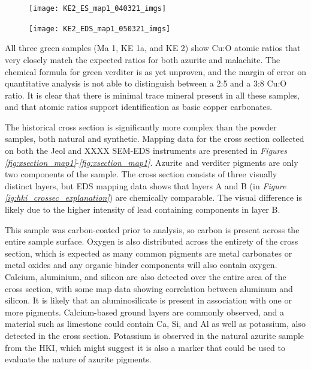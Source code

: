 \begin{figure}[H]
\centering
  \texttt{[image: KE2\_ES\_map1\_040321\_imgs]}
\label{fig:ke2_map1}
\end{figure}

\begin{figure}[H]
\centering
  \texttt{[image: KE2\_EDS\_map1\_050321\_imgs]}
\label{fig:ke2_map2}
\end{figure}

All three green samples (Ma 1, KE 1a, and KE 2) show Cu:O atomic ratios that very closely match the expected ratios for both azurite and malachite. The chemical formula for green verditer is as yet unproven, and the margin of error on quantitative analysis is not able to distinguish between a 2:5 and a 3:8 Cu:O ratio. It is clear that there is minimal trace mineral present in all these samples, and that atomic ratios support identification as basic copper carbonates.


The historical cross section is significantly more complex than the powder samples, both natural and synthetic. Mapping data for the cross section collected on both the Jeol and XXXX SEM-EDS instruments are presented in \textit{Figures \ref{fig:xsection_map1}}-\textit{\ref{fig:xsection_map1}}. Azurite and verditer pigments are only two components of the sample. The cross section consists of three visually distinct layers, but EDS mapping data shows that layers A and B (in \textit{Figure \ref{ig:hki_crossec_explanation}}) are chemically comparable. The visual difference is likely due to the higher intensity of lead containing components in layer B. 

This sample was carbon-coated prior to analysis, so carbon is present across the entire sample surface. Oxygen is also distributed across the entirety of the cross section, which is expected as many common pigments are metal carbonates or metal oxides and any organic binder components will also contain oxygen. Calcium, aluminium, and silicon are also detected over the entire area of the cross section, with some map data showing correlation between aluminum and silicon. It is likely that an aluminosilicate is present in association with one or more pigments. Calcium-based ground layers are commonly observed, and a material such as limestone could contain Ca, Si, and Al as well as potassium, also detected in the cross section. Potassium is observed in the natural azurite sample from the HKI, which might suggest it is also a marker that could be used to evaluate the nature of azurite pigments.

